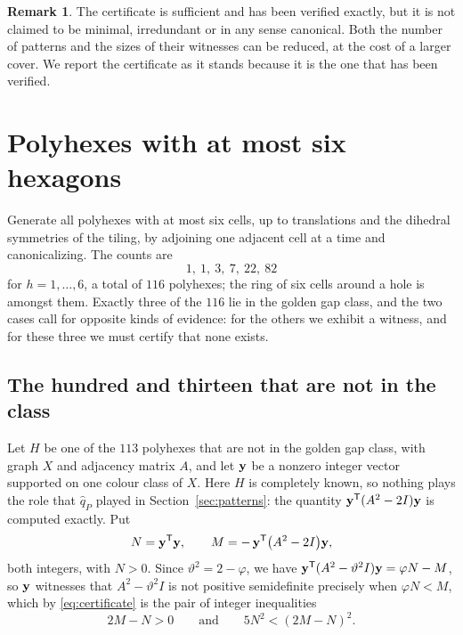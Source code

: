 \documentclass[11pt]{article}
\newcommand\vphi{\varphi}
\newcommand\thetaG{\vartheta}
\newcommand\tp{^{\mathsf T}}
\theoremstyle{definition}
\newtheorem{remark}[theorem]{Remark}
\begin{document}
\begin{remark}\label{rem:compress}
The certificate is sufficient and has been verified exactly, but it is not
claimed to be minimal, irredundant or in any sense canonical.  Both the
number of patterns and the sizes of their witnesses can be reduced, at the
cost of a larger cover.  We report the certificate as it stands because it
is the one that has been verified.
\end{remark}

\section{Polyhexes with at most six hexagons}\label{sec:small}

Generate all polyhexes with at most six cells, up to translations and the
dihedral symmetries of the tiling, by adjoining one adjacent cell at a time
and canonicalizing.  The counts are
\begin{equation}\label{eq:small-counts}
 1,\ 1,\ 3,\ 7,\ 22,\ 82
\end{equation}
for $h=1,\ldots,6$, a total of $116$ polyhexes; the ring of six cells around
a hole is amongst them.  Exactly three of the $116$ lie in the golden gap
class, and the two cases call for opposite kinds of evidence: for the others
we exhibit a witness, and for these three we must certify that none exists.

\subsection{The hundred and thirteen that are not in the class}

Let $H$ be one of the $113$ polyhexes that are not in the golden gap class,
with graph $X$ and adjacency matrix $A$, and let ${\mathbf y}$ be a nonzero integer
vector supported on one colour class of $X$.  Here $H$ is completely known,
so nothing plays the role that $\widehat q_P$ played in
Section~\ref{sec:patterns}: the quantity $\Zy\tp(A^{2}-2I)\Zy$ is computed
exactly.  Put
\[
 N=\Zy\tp\Zy,\qquad M=-\,\Zy\tp\bigl(A^{2}-2I\bigr)\Zy ,
\]
both integers, with $N>0$.  Since $\thetaG^{2}=2-\vphi$, we have
$\Zy\tp(A^{2}-\thetaG^{2}I)\Zy=\vphi N-M$, so ${\mathbf y}$ witnesses that
$A^{2}-\thetaG^{2}I$ is not positive semidefinite precisely when $\vphi N<M$,
which by \eqref{eq:certificate} is the pair of integer inequalities
\begin{equation}\label{eq:small-certificate}
 2M-N>0\qquad\text{and}\qquad 5N^{2}<(2M-N)^{2}.
\end{equation}
\end{document}

